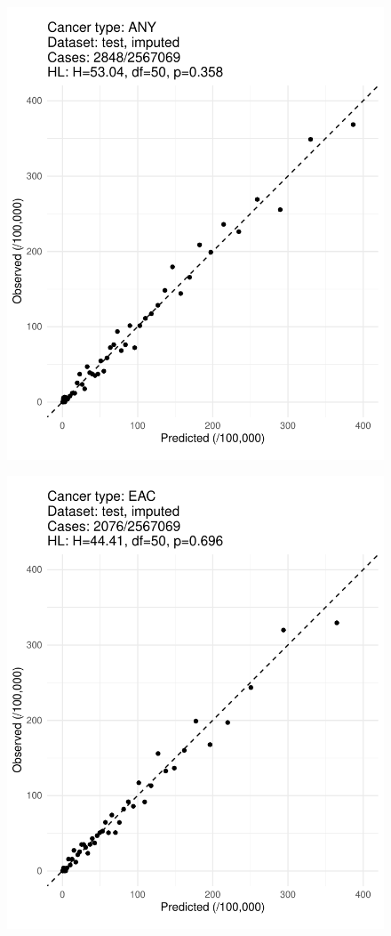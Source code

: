 \documentclass[12pt]{article}
\begin{document}
\begin{figure}[ht]
\includegraphics[width=1.0\linewidth]{calibration/ANY_imputed.pdf}
\end{figure}
\begin{figure}[ht]
\includegraphics[width=1.0\linewidth]{calibration/EAC_imputed.pdf}
\end{figure}
\end{document}
